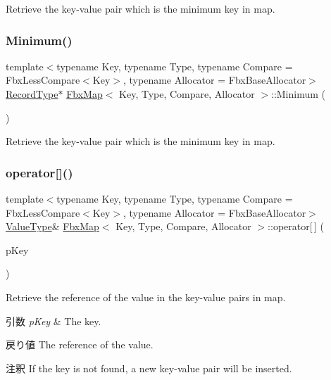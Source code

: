 Retrieve the key-\/value pair which is the minimum key in map. 

\mbox{\label{class_fbx_map_a5ea3f42780e9896b0503f9a67ee8607e}} 
\subsubsection{\texorpdfstring{Minimum()}{Minimum()}\hspace{0.1cm}{\footnotesize\ttfamily [2/2]}}
{\footnotesize\ttfamily template$<$typename Key, typename Type, typename Compare = Fbx\+Less\+Compare$<$\+Key$>$, typename Allocator = Fbx\+Base\+Allocator$>$ \\
\hyperlink{class_fbx_map_af8fc887461b3bf29f41aa36d15ddb54f}{Record\+Type}$\ast$ \hyperlink{class_fbx_map}{Fbx\+Map}$<$ Key, Type, Compare, Allocator $>$\+::Minimum (\begin{DoxyParamCaption}{ }\end{DoxyParamCaption})}



Retrieve the key-\/value pair which is the minimum key in map. 

\mbox{\label{class_fbx_map_a2c0f757eed20687c6b8fd3339c0f35ce}} 
\subsubsection{\texorpdfstring{operator[]()}{operator[]()}}
{\footnotesize\ttfamily template$<$typename Key, typename Type, typename Compare = Fbx\+Less\+Compare$<$\+Key$>$, typename Allocator = Fbx\+Base\+Allocator$>$ \\
\hyperlink{class_fbx_map_abea530b1192b31c3cf05fbf247e3dcaa}{Value\+Type}\& \hyperlink{class_fbx_map}{Fbx\+Map}$<$ Key, Type, Compare, Allocator $>$\+::operator\mbox{[}$\,$\mbox{]} (\begin{DoxyParamCaption}\item[{const \hyperlink{class_fbx_map_ad8392c83b6f8eeb9e0706bcc8674270a}{Key\+Type} \&}]{p\+Key }\end{DoxyParamCaption})}

Retrieve the reference of the value in the key-\/value pairs in map. 
\begin{DoxyParams}{引数}
{\em p\+Key} & The key. \\
\hline
\end{DoxyParams}
\begin{DoxyReturn}{戻り値}
The reference of the value. 
\end{DoxyReturn}
\begin{DoxyRemark}{注釈}
If the key is not found, a new key-\/value pair will be inserted. 
\end{DoxyRemark}
\mbox{\label{class_fbx_map_ae4d2e72014223a8292472394d80e4909}} 
